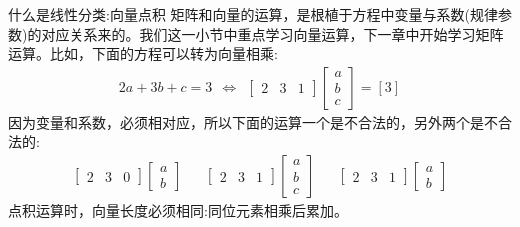 \documentclass[handout]{ctexbeamer}
\begin{document}
\begin{frame}{什么是线性分类:向量点积}
矩阵和向量的运算，是根植于方程中变量与系数(规律参数)的对应关系来的。我们这一小节中重点学习向量运算，下一章中开始学习矩阵运算。比如，下面的方程可以转为向量相乘:
		\begin{align*}
			2a + 3b + c = 3 \ \ \Leftrightarrow \ \ \begin{bmatrix}
				2 & 3 & 1
			\end{bmatrix} \begin{bmatrix}
				a \\
				b \\
				c
			\end{bmatrix} = [3] 
		\end{align*}
		因为变量和系数，必须相对应，所以下面的运算一个是不合法的，另外两个是不合法的:
		\begin{align*}
			\begin{bmatrix}
				2 & 3 & 0
			\end{bmatrix} \begin{bmatrix}
				a \\
				b 
			\end{bmatrix} & & \begin{bmatrix}
				2 & 3 & 1
			\end{bmatrix} \begin{bmatrix}
				a \\
				b \\
				c
			\end{bmatrix} & & \begin{bmatrix}
				2 & 3 & 1
			\end{bmatrix} \begin{bmatrix}
				a \\
				b 
			\end{bmatrix}
		\end{align*}	
		点积运算时，向量长度必须相同:同位元素相乘后累加。
\end{frame}
\end{document}

